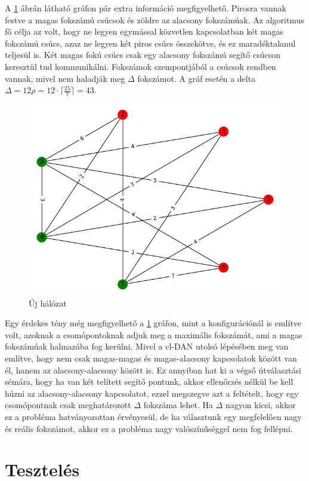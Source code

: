 \documentclass[12pt]{report}
\begin{document}
A \ref{routing-scheme} ábrán látható gráfon pár extra információ megfigyelhető. 
Pirosra vannak festve a magas fokszámú csúcsok és zöldre az alacsony fokszámúak.
Az algoritmus fő célja az volt, hogy ne legyen egymással közvetlen kapcsolatban két magas fokszámú csúcs, azaz ne legyen két piros csúcs összekötve, és ez maradéktalanul teljesül is.
Két magas fokú csúcs csak egy alacsony fokszámú segítő csúcson keresztül tud kommunikálni.
Fokszámok szempontjából a csúcsok rendben vannak, mivel nem haladják meg $\Delta$ fokszámot. 
A gráf esetén a delta \(\Delta = 12\rho = 12 \cdot \lceil\frac{25}{7}\rceil = 43  \).

\begin{figure}[H]
	\begin{center}
		\includegraphics[width=0.49\linewidth]{pictures/new_network.png}
		\caption{Új hálózat}
		\label{routing-scheme}
	\end{center}
\end{figure}

Egy érdekes tény még megfigyelhető a \ref{routing-scheme} gráfon, mint a konfigurációnál is említve volt, azoknak a csomópontoknak adjuk meg a maximális fokszámát, ami a magas fokszámúak halmazába fog kerülni. 
Mivel a cl-DAN utolsó lépésében meg van említve, hogy nem csak magas-magas és magas-alacsony kapcsolatok között van él, hanem az alacsony-alacsony között is.
Ez annyiban hat ki a végső útválasztási sémára, hogy ha van két telített segítő pontunk, akkor ellenőrzés nélkül be kell húzni az alacsony-alacsony kapcsolatot, ezzel megszegve azt a feltételt, hogy egy csomópontnak csak meghatározott $\Delta$ fokszáma lehet.
Ha $\Delta$ nagyon kicsi, akkor ez a probléma hatványozottan érvényesül, de ha választunk egy megfelelően nagy és reális fokszámot, akkor ez a probléma nagy valószínűséggel nem fog fellépni.
	


\chapter{Tesztelés}
\end{document}
